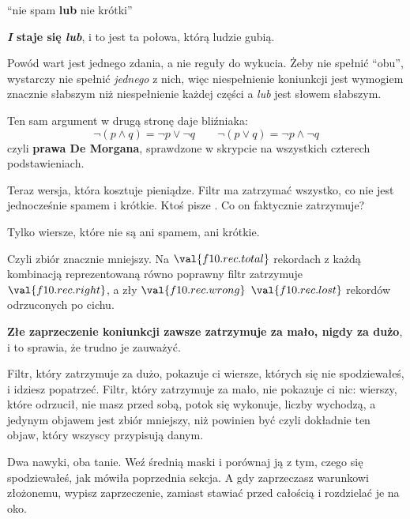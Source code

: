 \begin{fr}
\begin{ansblock}
\enquote{nie spam \textbf{lub} nie krótki}
\end{ansblock}

\textbf{\emph{I} staje się \emph{lub}}, i to jest ta połowa, którą ludzie
gubią.

Powód wart jest jednego zdania, a nie reguły do wykucia. Żeby nie spełnić
\enquote{obu}, wystarczy nie spełnić \emph{jednego} z nich, więc niespełnienie
koniunkcji jest wymogiem znacznie słabszym niż niespełnienie każdej części
\dash{} a \emph{lub} jest słowem słabszym.

Ten sam argument w drugą stronę daje bliźniaka:
\[ \lnot(p \land q) = \lnot p \lor \lnot q \qquad
   \lnot(p \lor q) = \lnot p \land \lnot q \]
czyli \textbf{prawa De Morgana}, sprawdzone w skrypcie na wszystkich czterech
podstawieniach.

Teraz wersja, która kosztuje pieniądze. Filtr ma zatrzymać wszystko, co nie
jest jednocześnie spamem i krótkie. Ktoś pisze .
Co on faktycznie zatrzymuje?
\dotline
\nextframe
\end{fr}

\begin{fr}
\begin{ansblock}
Tylko wiersze, które nie są ani spamem, ani krótkie.
\end{ansblock}

Czyli zbiór znacznie mniejszy. Na $\val{f10.rec.total}$ rekordach z każdą
kombinacją reprezentowaną równo poprawny filtr zatrzymuje
$\val{f10.rec.right}$, a zły $\val{f10.rec.wrong}$ \dash{}
$\val{f10.rec.lost}$ rekordów odrzuconych po cichu.

\begin{trapbox}
\textbf{Złe zaprzeczenie koniunkcji zawsze zatrzymuje za mało, nigdy za dużo},
i to sprawia, że trudno je zauważyć.

Filtr, który zatrzymuje za dużo, pokazuje ci wiersze, których się nie
spodziewałeś, i idziesz popatrzeć. Filtr, który zatrzymuje za mało, nie
pokazuje ci nic: wierszy, które odrzucił, nie masz przed sobą, potok się
wykonuje, liczby wychodzą, a jedynym objawem jest zbiór mniejszy, niż powinien
być \dash{} czyli dokładnie ten objaw, który wszyscy przypisują danym.

Dwa nawyki, oba tanie. Weź średnią maski i porównaj ją z tym, czego się
spodziewałeś, jak mówiła poprzednia sekcja. A gdy zaprzeczasz warunkowi
złożonemu, wypisz zaprzeczenie, zamiast stawiać  przed całością i
rozdzielać je na oko.
\end{trapbox}
\end{fr}

